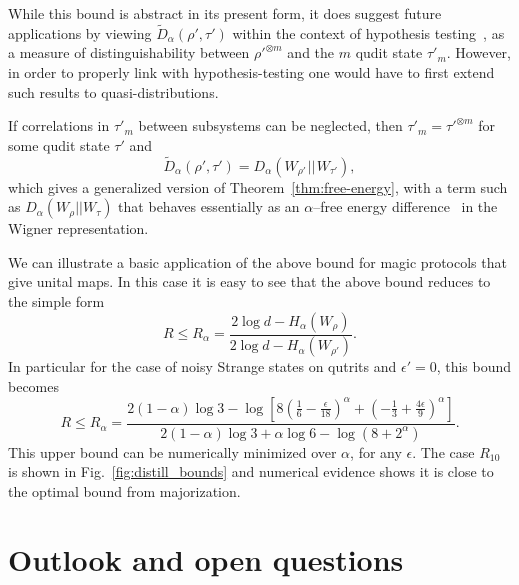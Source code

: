 \documentclass[pra,
aps,
twocolumn,
superscriptaddress,
groupedaddress,
nofootinbib,
reprint
]{revtex4-1}
\begin{document}
While this bound is abstract in its present form, it does suggest future applications by viewing $\widetilde{D}_\alpha( \rho', \tau')$ within the context of hypothesis testing~\cite{tomamichel2013}, as a measure of distinguishability between $\rho'^{\otimes m}$ and the $m$ qudit state $\tau'_m$. 
However, in order to properly link with hypothesis-testing one would have to first extend such results to quasi-distributions.

If correlations in $\tau'_m$ between subsystems can be neglected, then $\tau'_m = \tau'^{\otimes m}$ for some qudit state $\tau'$ and
\begin{equation}
	\widetilde{D}_\alpha( \rho', \tau') = D_\alpha (W_{\rho'} \hspace{1pt}||\hspace{1pt} W_{\tau'}),
\end{equation}
which gives a generalized version of Theorem~\ref{thm:free-energy}, with a term such as $D_\alpha(W_\rho ||W_\tau)$ that behaves essentially as an $\alpha$--free energy difference~\cite{Brandao_2015} in the Wigner representation.

We can illustrate a basic application of the above bound for magic protocols that give unital maps. In this case it is easy to see that the above bound reduces to the simple form
\begin{equation}
	R \leq R_\alpha=\frac{2\log d - H_{\alpha}(W_\rho)}{2\log d - H_{\alpha}(W_{\rho'})}.
\end{equation}
In particular for the case of noisy Strange states on qutrits and $\epsilon'=0$, this bound becomes
\begin{equation}
	R \leq R_\alpha=\frac{2(1-\alpha)\log 3 - \log \left [8(\frac{1}{6} - \frac{\epsilon}{18})^\alpha + (-\frac{1}{3} + \frac{4\epsilon}{9})^\alpha\right ] }{2(1-\alpha)\log 3 + \alpha \log 6 - \log (8 + 2^\alpha )}.
\end{equation}
This upper bound can be numerically minimized over $\alpha$, for any $\epsilon$. The case $R_{10}$ is shown in Fig.~\ref{fig:distill_bounds} and numerical evidence shows it is close to the optimal bound from majorization.

\section{Outlook and open questions}
\label{sec:lower_bounds}
\end{document}
